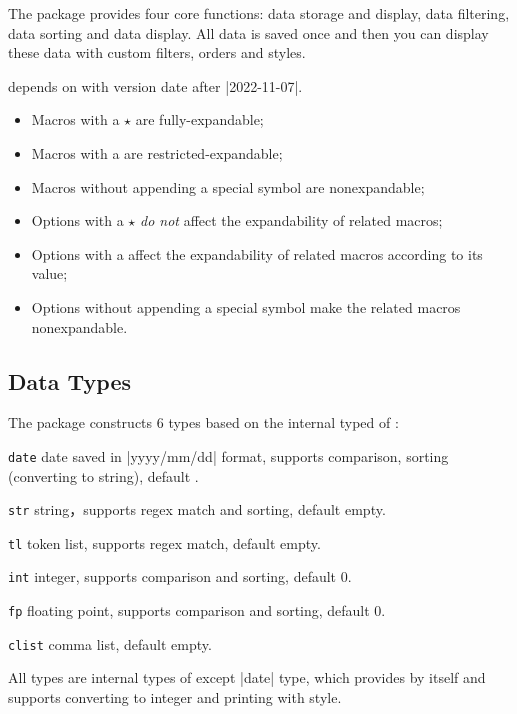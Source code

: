 \documentclass[full]{l3doc}
\begin{document}
\begin{documentation}
The package provides four core functions: data storage and display, data
filtering, data sorting and data display. All data is saved once and then you
can display these data with custom filters, orders and styles.

 depends on  with version date after |2022-11-07|.

\begin{itemize}
  \item Macros with a $\star$ are fully-expandable;
  \item Macros with a  are restricted-expandable;
  \item Macros without appending a special symbol are nonexpandable;
  \item Options with a $\star$ \textit{do not} affect the expandability of
    related macros;
  \item Options with a  affect the expandability of related macros
    according to its value;
  \item Options without appending a special symbol make the related macros
    nonexpandable.
\end{itemize}

\subsection{Data Types}

The package constructs 6 types based on the internal typed of :
\begin{Description}
  \item[\texttt{date}]
    date saved in |yyyy/mm/dd| format, supports comparison, sorting
    (converting to string), default .
  \item[\texttt{str}]
    string，supports regex match and sorting, default empty.
  \item[\texttt{tl}]
    token list, supports regex match, default empty.
  \item[\texttt{int}]
    integer, supports comparison and sorting, default 0.
  \item[\texttt{fp}]
    floating point, supports comparison and sorting, default 0.
  \item[\texttt{clist}]
    comma list, default empty.
\end{Description}

All types are internal types of  except |date| type, which provides
by  itself and supports converting to integer and printing with
style.


\end{documentation}
\end{document}
